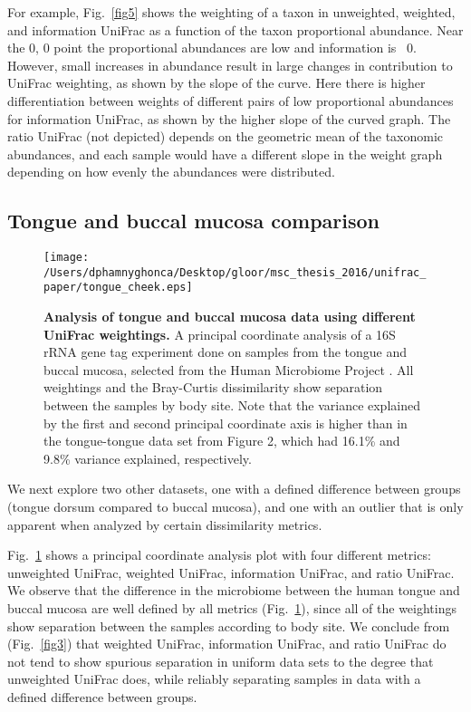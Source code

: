 \documentclass[10pt,letterpaper]{article}
\begin{document}
For example, Fig.~\ref{fig5} shows the weighting of a taxon in unweighted, weighted, and information UniFrac as a function of the taxon proportional abundance. Near the 0, 0 point the proportional abundances are low and information is ~0. However, small increases in abundance result in large changes in contribution to UniFrac weighting, as shown by the slope of the curve. Here there is higher differentiation between weights of different pairs of low proportional abundances for information UniFrac, as shown by the higher slope of the curved graph. The ratio UniFrac (not depicted) depends on the geometric mean of the taxonomic abundances, and each sample would have a different slope in the weight graph depending on how evenly the abundances were distributed.

\FloatBarrier

\subsection{Tongue and buccal mucosa comparison}

\begin{figure}[h]
\texttt{[image: /Users/dphamnyghonca/Desktop/gloor/msc\_thesis\_2016/unifrac\_paper/tongue\_cheek.eps]}
\caption[Analysis of tongue and buccal mucosa data using different UniFrac weightings.]{{\bf Analysis of tongue and buccal mucosa data using different UniFrac weightings. }
A principal coordinate analysis of a 16S rRNA gene tag experiment done on samples from the tongue and buccal mucosa, selected from the Human Microbiome Project \cite{turnbaugh2007human}. All weightings and the Bray-Curtis dissimilarity show separation between the samples by body site. Note that the variance explained by the first and second principal coordinate axis is higher than in the tongue-tongue data set from Figure 2, which had 16.1\% and 9.8\% variance explained, respectively.}
\label{fig6}
\end{figure}

We next explore two other datasets, one with a defined difference between groups (tongue dorsum compared to buccal mucosa), and one with an outlier that is only apparent when analyzed by certain dissimilarity metrics.

Fig.~\ref{fig6} shows a principal coordinate analysis plot with four different metrics: unweighted UniFrac, weighted UniFrac, information UniFrac, and ratio UniFrac. We observe that the difference in the microbiome between the human tongue and buccal mucosa are well defined by all metrics (Fig.~\ref{fig6}), since all of the weightings show separation between the samples according to body site. We conclude from (Fig.~\ref{fig3}) that weighted UniFrac, information UniFrac, and ratio UniFrac do not tend to show spurious separation in uniform data sets to the degree that unweighted UniFrac does, while reliably separating samples in data with a defined difference between groups.
\end{document}
